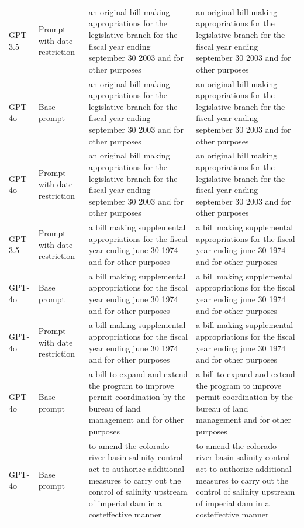\begin{longtable}{>{\raggedright\arraybackslash}p{1.4cm}>{\raggedright\arraybackslash}p{1.4cm}>{\raggedright\arraybackslash}p{5.5cm}>{\raggedright\arraybackslash}p{5.5cm}}
GPT-3.5 & Prompt with date restriction & an original bill making appropriations for the legislative branch for the fiscal year ending september 30 2003 and for other purposes & an original bill making appropriations for the legislative branch for the fiscal year ending september 30 2003 and for other purposes\\
GPT-4o & Base prompt & an original bill making appropriations for the legislative branch for the fiscal year ending september 30 2003 and for other purposes & an original bill making appropriations for the legislative branch for the fiscal year ending september 30 2003 and for other purposes\\
GPT-4o & Prompt with date restriction & an original bill making appropriations for the legislative branch for the fiscal year ending september 30 2003 and for other purposes & an original bill making appropriations for the legislative branch for the fiscal year ending september 30 2003 and for other purposes\\
GPT-3.5 & Prompt with date restriction & a bill making supplemental appropriations for the fiscal year ending june 30 1974 and for other purposes & a bill making supplemental appropriations for the fiscal year ending june 30 1974 and for other purposes\\
GPT-4o & Base prompt & a bill making supplemental appropriations for the fiscal year ending june 30 1974 and for other purposes & a bill making supplemental appropriations for the fiscal year ending june 30 1974 and for other purposes\\
GPT-4o & Prompt with date restriction & a bill making supplemental appropriations for the fiscal year ending june 30 1974 and for other purposes & a bill making supplemental appropriations for the fiscal year ending june 30 1974 and for other purposes\\
GPT-4o & Base prompt & a bill to expand and extend the program to improve permit coordination by the bureau of land management and for other purposes & a bill to expand and extend the program to improve permit coordination by the bureau of land management and for other purposes\\
GPT-4o & Base prompt & to amend the colorado river basin salinity control act to authorize additional measures to carry out the control of salinity upstream of imperial dam in a costeffective manner & to amend the colorado river basin salinity control act to authorize additional measures to carry out the control of salinity upstream of imperial dam in a costeffective manner\\

\end{longtable}
